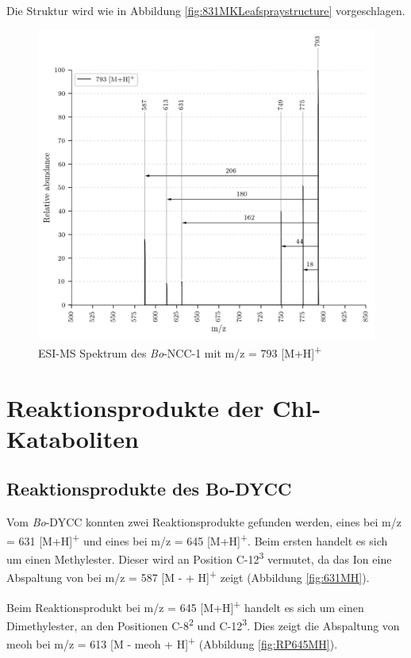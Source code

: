 Die Struktur wird wie in Abbildung \ref{fig:831MKLeafspraystructure} vorgeschlagen.

\begin{figure}[!htbp]
  \centering
  \includegraphics[width=\textwidth, height=0.7\textwidth]{figures/Kapitel7/Kataboliten/VWA_MS_793.png}
  \caption[ESI-MS Spektrum des \textit{Bo}-NCC-1, Quelle: Autor]{ESI-MS Spektrum des \textit{Bo}-NCC-1 mit m/z = 793 [M+H]\textsuperscript{+}}
  \label{fig:793MH}
\end{figure}



\pagebreak
\section{Reaktionsprodukte der Chl-Kataboliten}

\subsection{Reaktionsprodukte des Bo-DYCC}

Vom \textit{Bo}-DYCC konnten zwei Reaktionsprodukte gefunden werden, eines bei m/z = 631 [M+H]\textsuperscript{+} und eines bei m/z = 645 [M+H]\textsuperscript{+}. Beim ersten handelt es sich um einen Methylester. Dieser wird an Position C-12\textsuperscript{3} vermutet, da das Ion eine Abspaltung von  bei m/z = 587 [M -  + H]\textsuperscript{+} zeigt (Abbildung \ref{fig:631MH}). 

Beim Reaktionsprodukt bei m/z = 645 [M+H]\textsuperscript{+} handelt es sich um einen Dimethylester, an den Positionen C-8\textsuperscript{2} und C-12\textsuperscript{3}.  Dies zeigt die Abspaltung von \gls{meoh} bei m/z = 613 [M - \gls{meoh} + H]\textsuperscript{+} (Abbildung \ref{fig:RP645MH}). 

